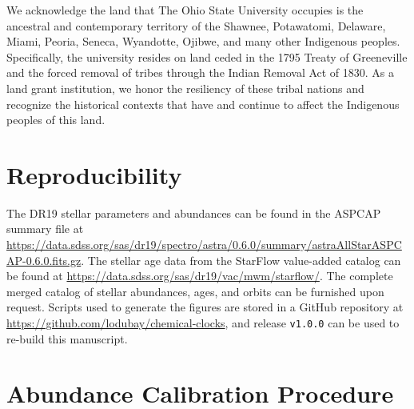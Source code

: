 \documentclass[twocolumn,twocolappendix]{aastex701}
\begin{document}
We acknowledge the land that The Ohio State University occupies is the ancestral and contemporary territory of the Shawnee, Potawatomi, Delaware, Miami, Peoria, Seneca, Wyandotte, Ojibwe, and many other Indigenous peoples. Specifically, the university resides on land ceded in the 1795 Treaty of Greeneville and the forced removal of tribes through the Indian Removal Act of 1830. As a land grant institution, we honor the resiliency of these tribal nations and recognize the historical contexts that have and continue to affect the Indigenous peoples of this land.


\appendix

\section{Reproducibility}
\label{app:reproducibility}

The DR19 stellar parameters and abundances can be found in the ASPCAP summary file at \url{https://data.sdss.org/sas/dr19/spectro/astra/0.6.0/summary/astraAllStarASPCAP-0.6.0.fits.gz}. The stellar age data from the StarFlow value-added catalog can be found at \url{https://data.sdss.org/sas/dr19/vac/mwm/starflow/}. The complete merged catalog of stellar abundances, ages, and orbits can be furnished upon request. Scripts used to generate the figures are stored in a GitHub repository at \url{https://github.com/lodubay/chemical-clocks}, and release \texttt{v1.0.0} can be used to re-build this manuscript.

\section{Abundance Calibration Procedure}
\label{app:logg-calibration-procedure}
\end{document}
